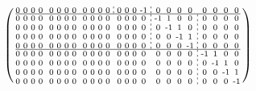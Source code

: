 \documentclass[pdftex,a4paper,parskip,listof=totoc,bibliography=totoc,onehalfspacing,12pt]{scrreprt}
\newcommand*\dashline{\hspace{-0.3em}\rotatebox[origin=c]{90}{\scalebox{-0.3}[1]{$-~~-$}}\hspace{-0.3em}}
\begin{document}
\begin{align*}
\begin{psmallmatrix}
0 & 0 & 0 & 0 && 0 & 0 & 0 & 0 && 0 & 0 & 0 & 0 &\dashline& 0 & 0 & 0 & \text{-}1 &\dashline& 0 & 0 & 0 & 0 && 0 & 0 & 0 & 0 \\\hline
0 & 0 & 0 & 0 && 0 & 0 & 0 & 0 && 0 & 0 & 0 & 0 && 0 & 0 & 0 & 0 &\dashline& \text{-}1 & 1 & 0 & 0 &\dashline& 0 & 0 & 0 & 0 \\
0 & 0 & 0 & 0 && 0 & 0 & 0 & 0 && 0 & 0 & 0 & 0 && 0 & 0 & 0 & 0 &\dashline& 0 & \text{-}1 & 1 & 0 &\dashline& 0 & 0 & 0 & 0 \\
0 & 0 & 0 & 0 && 0 & 0 & 0 & 0 && 0 & 0 & 0 & 0 && 0 & 0 & 0 & 0 &\dashline& 0 & 0 & \text{-}1 & 1 &\dashline& 0 & 0 & 0 & 0 \\
0 & 0 & 0 & 0 && 0 & 0 & 0 & 0 && 0 & 0 & 0 & 0 && 0 & 0 & 0 & 0 &\dashline& 0 & 0 & 0 & \text{-}1 &\dashline& 0 & 0 & 0 & 0 \\\hline
0 & 0 & 0 & 0 && 0 & 0 & 0 & 0 && 0 & 0 & 0 & 0 && 0 & 0 & 0 & 0 && 0 & 0 & 0 & 0 &\dashline& \text{-}1 & 1 & 0 & 0 \\
0 & 0 & 0 & 0 && 0 & 0 & 0 & 0 && 0 & 0 & 0 & 0 && 0 & 0 & 0 & 0 && 0 & 0 & 0 & 0 &\dashline& 0 & \text{-}1 & 1 & 0 \\
0 & 0 & 0 & 0 && 0 & 0 & 0 & 0 && 0 & 0 & 0 & 0 && 0 & 0 & 0 & 0 && 0 & 0 & 0 & 0 &\dashline& 0 & 0 & \text{-}1 & 1 \\
0 & 0 & 0 & 0 && 0 & 0 & 0 & 0 && 0 & 0 & 0 & 0 && 0 & 0 & 0 & 0 && 0 & 0 & 0 & 0 &\dashline& 0 & 0 & 0 & \text{-}1 \\
\end{psmallmatrix}
\end{align*}
\end{document}
